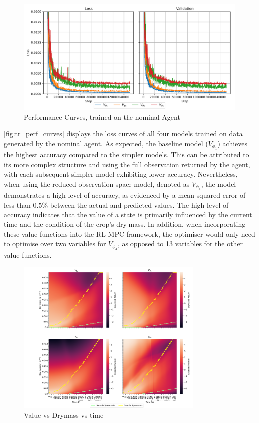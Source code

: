 \begin{figure}[H]
    \centering
    \includegraphics[width = \textwidth]{figures/tr_training_graphs.pdf}
    \caption{Performance Curves, trained on the nominal Agent}
    \label{fig:tr_perf_curves}
\end{figure}



\autoref{fig:tr_perf_curves} displays the loss curves of all four models trained on data generated by the nominal agent. As expected, the baseline model ($V_{\phi_1}$) achieves the highest accuracy compared to the simpler models. This can be attributed to its more complex structure and using the full observation returned by the agent, with each subsequent simpler model exhibiting lower accuracy. Nevertheless, when using the reduced observation space model, denoted as $V_{\phi_4}$, the model demonstrates a high level of accuracy, as evidenced by a mean squared error of less than $0.5\%$ between the actual and predicted values. The high level of accuracy indicates that the value of a state is primarily influenced by the current time and the condition of the crop’s dry mass. In addition, when incorporating these value functions into the RL-MPC framework, the optimiser would only need to optimise over two variables for $V_{\phi_4}$, as opposed to 13 variables for the other value functions.

\begin{figure}[H]
	\centering
	\includegraphics[width = 0.8\textwidth]{figures/vf_heatmap_deterministic.png}
	\caption{Value vs Drymass vs time}
	\label{fig:vf_heatmaps}
\end{figure}

